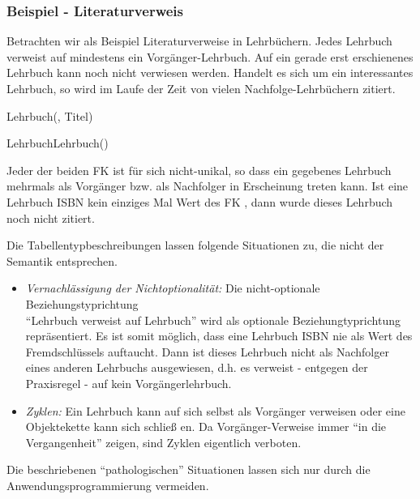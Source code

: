         \subsubsection{Beispiel - Literaturverweis}
          Betrachten wir als Beispiel Literaturverweise in Lehrbüchern. Jedes Lehrbuch verweist auf mindestens ein Vorgänger-Lehrbuch. Auf ein gerade erst erschienenes Lehrbuch kann noch nicht verwiesen werden. Handelt es sich um ein interessantes Lehrbuch, so wird im Laufe der Zeit von vielen Nachfolge-Lehrbüchern zitiert.
          \begin{center}
          \end{center}
        \begin{small}
          Lehrbuch(, Titel)

          LehrbuchLehrbuch()
        \end{small}

          Jeder der beiden FK ist für sich nicht-unikal, so dass ein gegebenes Lehrbuch mehrmals als Vorgänger bzw. als Nachfolger in Erscheinung treten kann. Ist eine Lehrbuch ISBN kein einziges Mal Wert des FK , dann wurde dieses Lehrbuch noch nicht zitiert.

          Die Tabellentypbeschreibungen lassen folgende Situationen zu, die nicht der Semantik entsprechen.
          \begin{itemize}
            \item \textit{Vernachlässigung der Nichtoptionalität:} Die nicht-optionale Beziehungstyprichtung\\ \enquote{Lehrbuch verweist auf Lehrbuch} wird als optionale Beziehungtyprichtung repräsentiert. Es ist somit möglich, dass eine Lehrbuch ISBN nie als Wert des Fremdschlüssels  auftaucht. Dann ist dieses Lehrbuch nicht als Nachfolger eines anderen Lehrbuchs ausgewiesen, d.h. es verweist - entgegen der Praxisregel - auf kein Vorgängerlehrbuch.
            \item \textit{Zyklen:} Ein Lehrbuch kann auf sich selbst als Vorgänger verweisen oder eine Objektekette kann sich schließ en. Da Vorgänger-Verweise immer \enquote{in die Vergangenheit} zeigen, sind Zyklen eigentlich verboten.
          \end{itemize}
          Die beschriebenen \enquote{pathologischen} Situationen lassen sich nur durch die Anwendungsprogrammierung vermeiden.
